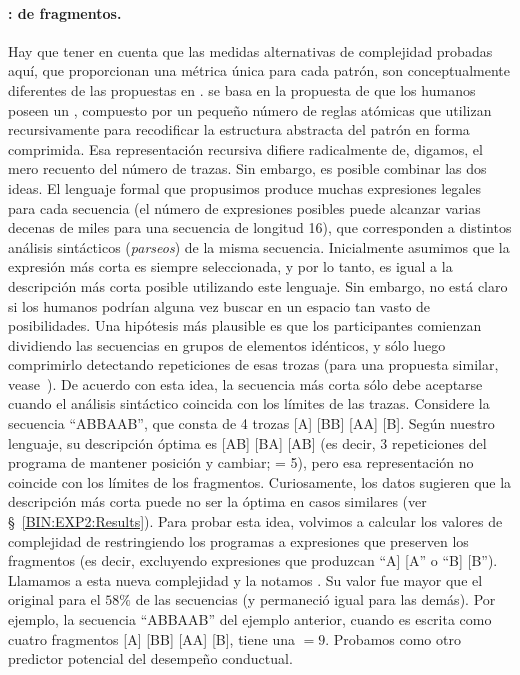 \paragraph{\mdlbinfrag: \mdlbin de fragmentos.} Hay que tener en cuenta que las medidas alternativas de complejidad probadas aquí, que proporcionan una métrica única para cada patrón, son conceptualmente diferentes de las propuestas en \mdlbin. \mdlbin se basa en la propuesta de que los humanos poseen un \lot, compuesto por un pequeño número de reglas atómicas que utilizan recursivamente para recodificar la estructura abstracta del patrón en forma comprimida. Esa representación recursiva difiere radicalmente de, digamos, el mero recuento del número de trazas. Sin embargo, es posible combinar las dos ideas. El lenguaje formal que propusimos produce muchas expresiones legales para cada secuencia (el número de expresiones posibles puede alcanzar varias decenas de miles para una secuencia de longitud 16), que corresponden a distintos análisis sintácticos (\textit{parseos}) de la misma secuencia. Inicialmente asumimos que la expresión más corta es siempre seleccionada, y por lo tanto, \mdlbin es igual a la descripción más corta posible utilizando este lenguaje. Sin embargo, no está claro si los humanos podrían alguna vez buscar en un espacio tan vasto de posibilidades. Una hipótesis más plausible es que los participantes comienzan dividiendo las secuencias en grupos de elementos idénticos, y sólo luego comprimirlo detectando repeticiones de esas trozas (para una propuesta similar, vease~\cite{f33,leeuwenberg1971perceptual}). De acuerdo con esta idea, la secuencia más corta sólo debe aceptarse cuando el análisis sintáctico coincida con los límites de las trazas. Considere la secuencia ``ABBAAB'', que consta de 4 trozas [A] [BB] [AA] [B]. Según nuestro lenguaje, su descripción óptima es [AB] [BA] [AB] (es decir, 3 repeticiones del programa de mantener posición y cambiar; \mdlbin = 5), pero esa representación no coincide con los límites de los fragmentos. Curiosamente, los datos sugieren que la descripción más corta puede no ser la óptima en casos similares (ver \S~\ref{BIN:EXP2:Results}). Para probar esta idea, volvimos a calcular los valores de complejidad de \gramgeo restringiendo los programas a expresiones que preserven los fragmentos (es decir, excluyendo expresiones que produzcan ``A] [A'' o ``B] [B''). Llamamos a esta nueva complejidad  y la notamos \mdlbinfrag. Su valor fue mayor que el original para el $58\%$ de las secuencias (y permaneció igual para las demás). Por ejemplo, la secuencia ``ABBAAB'' del ejemplo anterior, cuando es escrita como cuatro fragmentos [A] [BB] [AA] [B], tiene una \mdlbinfrag $= 9$. Probamos \mdlbinfrag como otro predictor potencial del desempeño conductual.

